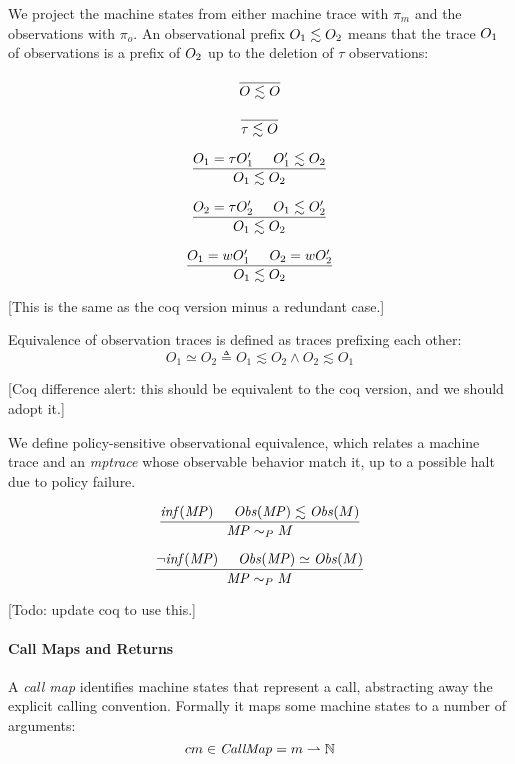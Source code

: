 \documentclass[conference]{IEEEtran}
\begin{document}
    We project the machine states from either machine trace with \(\pi_m\) and the observations with \(\pi_o\).
    An observational prefix \(O_1 \lesssim O_2\) means that the trace \(O_1\) of observations is
    a prefix of \(O_2\) up to the deletion of \(\tau\) observations:

    \[\frac{}
           {O \lesssim O}\]

    \[\frac{}
           {\tau \lesssim O}\]

    \[\frac{O_1 = \tau O_1' \hspace{.5cm} O_1' \lesssim O_2}
           {O_1 \lesssim O_2}\]

    \[\frac{O_2 = \tau O_2' \hspace{.5cm} O_1 \lesssim O_2'}
           {O_1 \lesssim O_2}\]

    \[\frac{O_1 = w O_1' \hspace{.5cm} O_2 = w O_2'}
           {O_1 \lesssim O_2}\]

    [This is the same as the coq version minus a redundant case.]

    Equivalence of observation traces is defined as traces prefixing each other:
    \[O_1 \simeq O_2 \triangleq O_1 \lesssim O_2 \land O_2 \lesssim O_1\]
    
    [Coq difference alert: this should be equivalent to the coq version, and we should adopt it.]

    We define policy-sensitive observational equivalence, which relates a machine trace and
    an {\it mptrace} whose observable behavior match it, up to a possible halt due to policy failure.

    \[\frac{\mathit{inf}(\mathit{MP}) \hspace{.5cm} \mathit{Obs}(\mathit{MP}) \lesssim \mathit{Obs}(M)}
           {\mathit{MP} \sim_P M}\]
    
    \[\frac{\neg \mathit{inf}(\mathit{MP}) \hspace{.5cm} \mathit{Obs}(\mathit{MP}) \simeq \mathit{Obs}(M)}
           {\mathit{MP} \sim_P M}\]

    [Todo: update coq to use this.]

  \paragraph{Call Maps and Returns}

    A {\it call map} identifies machine states that represent a call, abstracting away the explicit
    calling convention. Formally it maps some machine states to a number of arguments:
    \[cm \in \mathit{CallMap} = m \rightharpoonup \mathbb{N}\]
\end{document}
